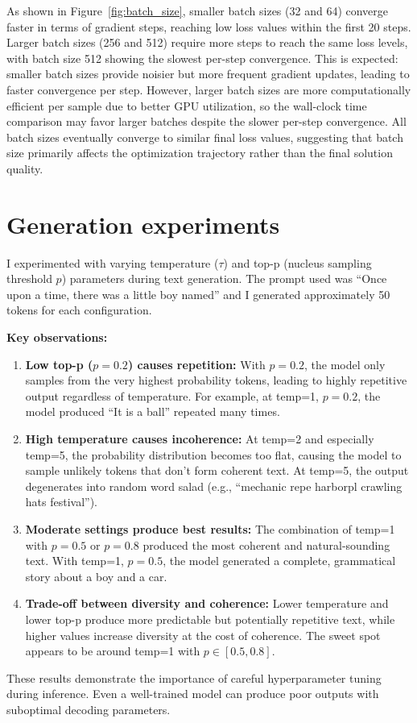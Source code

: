 \documentclass[11pt]{article}
\begin{document}
As shown in Figure~\ref{fig:batch_size}, smaller batch sizes (32 and 64) converge faster in terms of gradient steps, reaching low loss values within the first 20 steps. Larger batch sizes (256 and 512) require more steps to reach the same loss levels, with batch size 512 showing the slowest per-step convergence. This is expected: smaller batch sizes provide noisier but more frequent gradient updates, leading to faster convergence per step. However, larger batch sizes are more computationally efficient per sample due to better GPU utilization, so the wall-clock time comparison may favor larger batches despite the slower per-step convergence. All batch sizes eventually converge to similar final loss values, suggesting that batch size primarily affects the optimization trajectory rather than the final solution quality.

\section*{Generation experiments}
I experimented with varying temperature ($\tau$) and top-p (nucleus sampling threshold $p$) parameters during text generation. The prompt used was ``Once upon a time, there was a little boy named'' and I generated approximately 50 tokens for each configuration.

\textbf{Key observations:}

\begin{enumerate}
    \item \textbf{Low top-p ($p=0.2$) causes repetition:} With $p=0.2$, the model only samples from the very highest probability tokens, leading to highly repetitive output regardless of temperature. For example, at temp=1, $p=0.2$, the model produced ``It is a ball'' repeated many times.

    \item \textbf{High temperature causes incoherence:} At temp=2 and especially temp=5, the probability distribution becomes too flat, causing the model to sample unlikely tokens that don't form coherent text. At temp=5, the output degenerates into random word salad (e.g., ``mechanic repe harborpl crawling hats festival'').

    \item \textbf{Moderate settings produce best results:} The combination of temp=1 with $p=0.5$ or $p=0.8$ produced the most coherent and natural-sounding text. With temp=1, $p=0.5$, the model generated a complete, grammatical story about a boy and a car.

    \item \textbf{Trade-off between diversity and coherence:} Lower temperature and lower top-p produce more predictable but potentially repetitive text, while higher values increase diversity at the cost of coherence. The sweet spot appears to be around temp=1 with $p \in [0.5, 0.8]$.
\end{enumerate}

These results demonstrate the importance of careful hyperparameter tuning during inference. Even a well-trained model can produce poor outputs with suboptimal decoding parameters.
\end{document}
